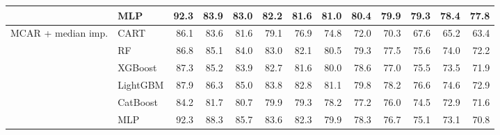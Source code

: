 \begin{table}[p]
\begin{tabular}{@{}llrrrrrrrrrrr@{}}
 & MLP & 92.3 & 83.9 & 83.0 & 82.2 & 81.6 & 81.0 & 80.4 & 79.9 & 79.3 & 78.4 & 77.8 \\
\midrule
MCAR + median imp. & CART & 86.1 & 83.6 & 81.6 & 79.1 & 76.9 & 74.8 & 72.0 & 70.3 & 67.6 & 65.2 & 63.4 \\
 & RF & 86.8 & 85.1 & 84.0 & 83.0 & 82.1 & 80.5 & 79.3 & 77.5 & 75.6 & 74.0 & 72.2 \\
 & XGBoost & 87.3 & 85.2 & 83.9 & 82.7 & 81.6 & 80.0 & 78.6 & 77.0 & 75.5 & 73.5 & 71.9 \\
 & LightGBM & 87.9 & 86.3 & 85.0 & 83.8 & 82.8 & 81.1 & 79.8 & 78.2 & 76.6 & 74.6 & 72.9 \\
 & CatBoost & 84.2 & 81.7 & 80.7 & 79.9 & 79.3 & 78.2 & 77.2 & 76.0 & 74.5 & 72.9 & 71.6 \\
 & MLP & 92.3 & 88.3 & 85.7 & 83.6 & 82.3 & 79.9 & 78.3 & 76.7 & 75.1 & 73.1 & 70.8 \\
\bottomrule
\end{tabular}
\end{table}

